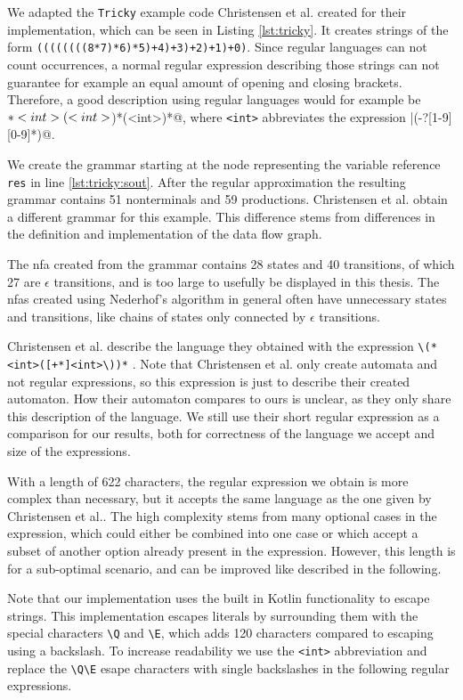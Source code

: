 We adapted the \lstinline|Tricky| example code Christensen et al. \cite{brics} created for their implementation, which can be seen in Listing \ref{lst:tricky}. It creates strings of the form \lstinline|((((((((8*7)*6)*5)+4)+3)+2)+1)+0)|. Since regular languages can not count occurrences, a normal regular expression describing those strings can not guarantee for example an equal amount of opening and closing brackets. Therefore, a good description using regular languages would for example be \Verb@\(*<int>(\*<int>\))*(\+<int>\))*@, where \Verb|<int>| abbreviates the expression |(-?[1-9][0-9]*)@.

We create the grammar starting at the node representing the variable reference \lstinline|res| in line \ref{lst:tricky:sout}.
After the regular approximation the resulting grammar contains 51 nonterminals and 59 productions.
Christensen et al. obtain a different grammar for this example. This difference stems from differences in the definition and implementation of the data flow graph.

The \ac{nfa} created from the grammar contains 28 states and 40 transitions, of which 27 are $\epsilon$ transitions, and is too large to usefully be displayed in this thesis.
The \acp{nfa} created using Nederhof's algorithm in general often have unnecessary states and transitions, like chains of states only connected by $\epsilon$ transitions.

Christensen et al. describe the language they obtained with the expression \Verb|\(*<int>([+*]<int>\))*| \cite{brics}. Note that Christensen et al. only create automata and not regular expressions, so this expression is just to describe their created automaton. How their automaton compares to ours is unclear, as they only share this description of the language. We still use  their short regular expression as a comparison for our results, both for correctness of the language we accept and size of the expressions.

With a length of 622 characters, the regular expression we obtain is more complex than necessary, but it accepts the same language as the one given by Christensen et al.. 
The high complexity stems from many optional cases in the expression, which could either be combined into one case or which accept a subset of another option already present in the expression.
However, this length is for a sub-optimal scenario, and can be improved like described in the following.

Note that our implementation uses the built in Kotlin functionality to escape strings. This implementation escapes literals by surrounding them with the special characters \lstinline|\Q| and \lstinline|\E|, which adds 120 characters compared to escaping using a backslash.
To increase readability we use the \lstinline|<int>| abbreviation and replace the \lstinline|\Q\E| esape characters with single backslashes in the following regular expressions.

